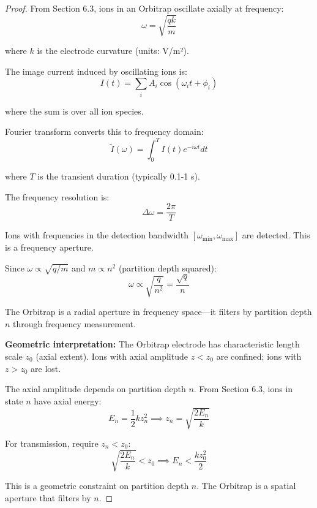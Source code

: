 \begin{proof}
From Section 6.3, ions in an Orbitrap oscillate axially at frequency:
\begin{equation}
\omega = \sqrt{\frac{qk}{m}}
\end{equation}

where $k$ is the electrode curvature (units: V/m²).

The image current induced by oscillating ions is:
\begin{equation}
I(t) = \sum_i A_i \cos(\omega_i t + \phi_i)
\end{equation}

where the sum is over all ion species.

Fourier transform converts this to frequency domain:
\begin{equation}
\tilde{I}(\omega) = \int_0^T I(t) e^{-i\omega t} dt
\end{equation}

where $T$ is the transient duration (typically 0.1-1 s).

The frequency resolution is:
\begin{equation}
\Delta\omega = \frac{2\pi}{T}
\end{equation}

Ions with frequencies in the detection bandwidth $[\omega_{\min}, \omega_{\max}]$ are detected. This is a frequency aperture.

Since $\omega \propto \sqrt{q/m}$ and $m \propto n^2$ (partition depth squared):
\begin{equation}
\omega \propto \sqrt{\frac{q}{n^2}} = \frac{\sqrt{q}}{n}
\end{equation}

The Orbitrap is a radial aperture in frequency space—it filters by partition depth $n$ through frequency measurement.

\textbf{Geometric interpretation:} The Orbitrap electrode has characteristic length scale $z_0$ (axial extent). Ions with axial amplitude $z < z_0$ are confined; ions with $z > z_0$ are lost.

The axial amplitude depends on partition depth $n$. From Section 6.3, ions in state $n$ have axial energy:
\begin{equation}
E_n = \frac{1}{2}kz_n^2 \implies z_n = \sqrt{\frac{2E_n}{k}}
\end{equation}

For transmission, require $z_n < z_0$:
\begin{equation}
\sqrt{\frac{2E_n}{k}} < z_0 \implies E_n < \frac{kz_0^2}{2}
\end{equation}

This is a geometric constraint on partition depth $n$. The Orbitrap is a spatial aperture that filters by $n$.
\end{proof}


